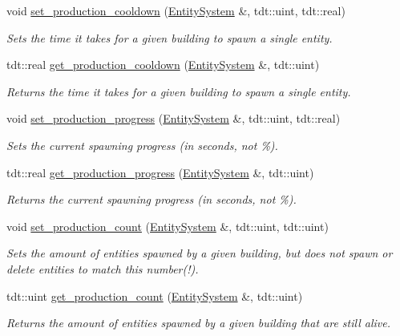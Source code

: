 \begin{DoxyCompactItemize}
void \hyperlink{namespace_production_helper_a510c513f13f9a5e8107ee4e2af7788fb}{set\+\_\+production\+\_\+cooldown} (\hyperlink{class_entity_system}{Entity\+System} \&, tdt\+::uint, tdt\+::real)
\begin{DoxyCompactList}\small\item\em Sets the time it takes for a given building to spawn a single entity. \end{DoxyCompactList}\item 
tdt\+::real \hyperlink{namespace_production_helper_ae011b13fdb3f5cb05604d9004013ef62}{get\+\_\+production\+\_\+cooldown} (\hyperlink{class_entity_system}{Entity\+System} \&, tdt\+::uint)
\begin{DoxyCompactList}\small\item\em Returns the time it takes for a given building to spawn a single entity. \end{DoxyCompactList}\item 
void \hyperlink{namespace_production_helper_aea98cb611224f5e872415c3f6697b548}{set\+\_\+production\+\_\+progress} (\hyperlink{class_entity_system}{Entity\+System} \&, tdt\+::uint, tdt\+::real)
\begin{DoxyCompactList}\small\item\em Sets the current spawning progress (in seconds, not \%). \end{DoxyCompactList}\item 
tdt\+::real \hyperlink{namespace_production_helper_ade7489cac01c43d2043581cf0cba60ec}{get\+\_\+production\+\_\+progress} (\hyperlink{class_entity_system}{Entity\+System} \&, tdt\+::uint)
\begin{DoxyCompactList}\small\item\em Returns the current spawning progress (in seconds, not \%). \end{DoxyCompactList}\item 
void \hyperlink{namespace_production_helper_a62c08a4a60ec3b5206aaf11249b1eff4}{set\+\_\+production\+\_\+count} (\hyperlink{class_entity_system}{Entity\+System} \&, tdt\+::uint, tdt\+::uint)
\begin{DoxyCompactList}\small\item\em Sets the amount of entities spawned by a given building, but does not spawn or delete entities to match this number(!). \end{DoxyCompactList}\item 
tdt\+::uint \hyperlink{namespace_production_helper_a4b7d6eb79049cc45241026090a3c2476}{get\+\_\+production\+\_\+count} (\hyperlink{class_entity_system}{Entity\+System} \&, tdt\+::uint)
\begin{DoxyCompactList}\small\item\em Returns the amount of entities spawned by a given building that are still alive. \end{DoxyCompactList}\end{DoxyCompactItemize}


